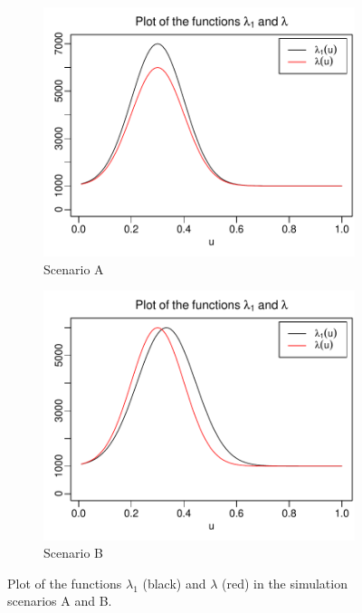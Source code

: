 \documentclass[a4paper,12pt]{article}
\numberwithin{equation}{section}
\begin{document}
\begin{figure}[t!]
\centering
\begin{subfigure}[b]{0.475\textwidth}
\includegraphics[width=\textwidth]{plots/lambda_fcts_height}
\caption{Scenario A}\label{fig:lambda_fcts_height}
\end{subfigure}\hspace{0.25cm}
\begin{subfigure}[b]{0.475\textwidth}
\includegraphics[width=\textwidth]{plots/lambda_fcts_shift}
\caption{Scenario B}\label{fig:lambda_fcts_shift}
\end{subfigure}
\caption{Plot of the functions $\lambda_1$ (black) and $\lambda$ (red) in the simulation scenarios A and B.}
\end{figure}
\end{document}
